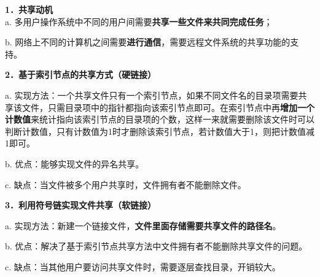 \textbf{{1．共享动机}}\\

a. 多用户操作系统中不同的用户间需要\textbf{共享一些文件来共同完成任务}；

b.
网络上不同的计算机之间需要\textbf{进行通信}，需要远程文件系统的共享功能的支持。

\textbf{{2．基于索引节点的共享方式（硬链接）}}

a.
实现方法：一个共享文件只有一个索引节点，如果不同文件名的目录项需要共享该文件，只需目录项中的指针都指向该索引节点即可。{在索引节点中再\textbf{增加一个计数值}来统计指向该索引节点的目录项的个数，这样一来就需要删除该文件时可以判断计数值，只有计数值为1时才删除该索引节点，若计数值大于1，则把计数值减1即可。}

b. 优点：能够实现文件的异名共享。

c. 缺点：当文件被多个用户共享时，文件拥有者不能删除文件。

\textbf{{3．利用符号链实现文件共享（软链接）}}

a.
实现方法：新建一个链接文件，\textbf{文件里面存储需要共享文件的路径名}。

b. 优点：解决了基于索引节点共享方法中文件拥有者不能删除共享文件的问题。

c. 缺点：当其他用户要访问共享文件时，需要逐层查找目录，开销较大。
